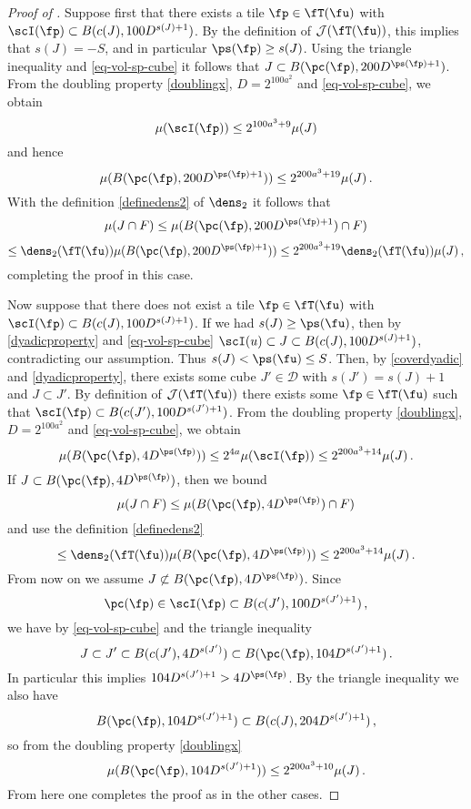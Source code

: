 \begin{proof}[Proof of ]
    Suppose first that there exists a tile $\fp \in \fT(\fu)$ with $\scI(\fp) \subset B(c(J), 100 D^{s(J) + 1})$. By the definition of $\mathcal{J}(\fT(\fu))$, this implies that $s(J) = -S$, and in particular $\ps(\fp) \ge s(J)$. Using the triangle inequality and \eqref{eq-vol-sp-cube} it follows that $J \subset B(\pc(\fp), 200 D^{\ps(\fp) + 1})$. From the doubling property \eqref{doublingx}, $D=2^{100a^2}$ and \eqref{eq-vol-sp-cube}, we obtain
    $$
        \mu(\scI(\fp)) \le 2^{100a^3 + 9} \mu(J)
    $$
    and hence
    $$
        \mu( B(\pc(\fp), 200 D^{\ps(\fp) + 1})) \le 2^{200a^3 +19} \mu(J)\,.
    $$
    With the definition \eqref{definedens2} of $\dens_2$ it follows that
    $$
        \mu(J \cap F) \le \mu( B(\pc(\fp), 200 D^{\ps(\fp) + 1}) \cap F)
    $$
    $$
        \le \dens_2(\fT(\fu)) \mu( B(\pc(\fp), 200 D^{\ps(\fp) + 1})) \le 2^{200a^3 +19} \dens_2(\fT(\fu))\mu(J)\,,
    $$
    completing the proof in this case.

    Now suppose that there does not exist a tile $\fp \in \fT(\fu)$ with $\scI(\fp) \subset B(c(J), 100 D^{s(J) + 1})$.
    If we had $s(J) \ge \ps(\fu)$, then by \eqref{dyadicproperty}
    and \eqref{eq-vol-sp-cube} $\scI(u) \subset J \subset B(c(J), 100 D^{s(J) + 1})$,
    contradicting our assumption.
    Thus $s(J) < \ps(\fu) \le S$.
    Then, by \eqref{coverdyadic} and \eqref{dyadicproperty}, there exists some cube $J' \in \mathcal{D}$ with $s(J') = s(J) + 1$ and $J \subset J'$.
    By definition of $\mathcal{J}(\fT(\fu))$ there exists some $\fp \in \fT(\fu)$ such that $\scI(\fp) \subset B(c(J'), 100 D^{s(J') + 1})$.
    From the doubling property \eqref{doublingx}, $D=2^{100a^2}$ and \eqref{eq-vol-sp-cube}, we obtain
    \begin{equation}
        \label{eq-measure-comparison-1}
        \mu(B(\pc(\fp), 4D^{\ps(\fp)})) \le 2^{4a} \mu(\scI(\fp)) \le 2^{200a^3 + 14} \mu(J)\,.
    \end{equation}
    If $J \subset B(\pc(\fp), 4 D^{\ps(\fp)})$, then we bound
    $$
        \mu(J \cap F) \le \mu(B(\pc(\fp), 4D^{\ps(\fp)}) \cap F)
    $$
    and use the definition \eqref{definedens2}
    $$
        \le \dens_2(\fT(\fu)) \mu(B(\pc(\fp), 4D^{\ps(\fp)})) \le 2^{200a^3 + 14} \mu(J)\,.
    $$
    From now on we assume $J \not \subset B(\pc(\fp), 4 D^{\ps(\fp)})$.
    Since
    \begin{equation*}
        \pc(\fp) \in \scI(\fp) \subset B(c(J'), 100 D^{s(J') + 1})\, ,
    \end{equation*}
    we have by \eqref{eq-vol-sp-cube} and the triangle inequality
    $$
        J \subset J' \subset B(c(J'), 4D^{s(J')}) \subset B(\pc(\fp), 104 D^{s(J') + 1})\,.
    $$
    In particular this implies $104 D^{s(J') + 1} > 4D^{\ps(\fp)}$. By the triangle inequality we also have
    $$
        B(\pc(\fp), 104 D^{s(J') + 1}) \subset B(c(J), 204 D^{s(J') + 1})\,,
    $$
    so from the doubling property \eqref{doublingx}
    $$
        \mu( B(\pc(\fp), 104 D^{s(J') + 1})) \le 2^{200a^3 + 10} \mu(J)\,.
    $$
    From here one completes the proof as in the other cases.
\end{proof}

